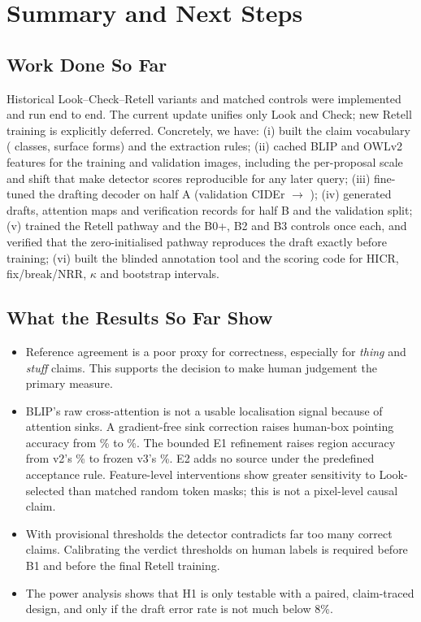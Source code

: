 \section{Summary and Next Steps}
\label{sec:conclusion}

\subsection{Work Done So Far}
Historical Look--Check--Retell variants and matched controls were implemented and run end to end. The current update unifies only Look and Check; new Retell training is explicitly deferred. Concretely, we have:
(i) built the claim vocabulary (\NumClasses{} classes, \NumSurface{} surface forms) and the extraction rules;
(ii) cached BLIP and OWLv2 features for the training and validation images, including the per-proposal scale and shift that make detector scores reproducible for any later query;
(iii) fine-tuned the drafting decoder on half A (validation CIDEr \ZsCIDEr{} $\to$ \FtCIDEr{});
(iv) generated drafts, attention maps and verification records for half B and the validation split;
(v) trained the Retell pathway and the B0+, B2 and B3 controls once each, and verified that the zero-initialised pathway reproduces the draft exactly before training;
(vi) built the blinded annotation tool and the scoring code for HICR, fix/break/NRR, $\kappa$ and bootstrap intervals.

\subsection{What the Results So Far Show}
\begin{itemize}
\item Reference agreement is a poor proxy for correctness, especially for \emph{thing} and \emph{stuff} claims. This supports the decision to make human judgement the primary measure.
\item BLIP's raw cross-attention is not a usable localisation signal because of attention sinks. A gradient-free sink correction raises human-box pointing accuracy from \LookRawPoint\% to \LookSinkPoint\%. The bounded E1 refinement raises region accuracy from v2's \LookVTwoRegion\% to frozen v3's \LookClosedRegion\%. E2 adds no source under the predefined acceptance rule. Feature-level interventions show greater sensitivity to Look-selected than matched random token masks; this is not a pixel-level causal claim.
\item With provisional thresholds the detector contradicts far too many correct claims. Calibrating the verdict thresholds on human labels is required before B1 and before the final Retell training.
\item The power analysis shows that H1 is only testable with a paired, claim-traced design, and only if the draft error rate is not much below 8\%.
\end{itemize}

